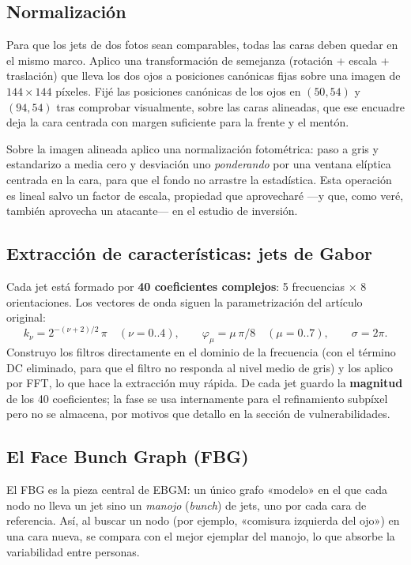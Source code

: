 \documentclass[11pt,a4paper]{article}
\begin{document}
\subsection{Normalización}

Para que los jets de dos fotos sean comparables, todas las caras deben quedar en el mismo
marco. Aplico una transformación de semejanza (rotación + escala + traslación) que lleva los
dos ojos a posiciones canónicas fijas sobre una imagen de $144\times144$ píxeles. Fijé las
posiciones canónicas de los ojos en $(50,54)$ y $(94,54)$ tras comprobar visualmente, sobre
las caras alineadas, que ese encuadre deja la cara centrada con margen suficiente para la
frente y el mentón.

Sobre la imagen alineada aplico una normalización fotométrica: paso a gris y estandarizo a
media cero y desviación uno \emph{ponderando} por una ventana elíptica centrada en la cara,
para que el fondo no arrastre la estadística. Esta operación es lineal salvo un factor de
escala, propiedad que aprovecharé ---y que, como veré, también aprovecha un atacante--- en el
estudio de inversión.

\subsection{Extracción de características: jets de Gabor}

Cada jet está formado por \textbf{40 coeficientes complejos}: 5 frecuencias
$\times$ 8 orientaciones. Los vectores de onda siguen la parametrización del artículo original:
\[
k_\nu = 2^{-(\nu+2)/2}\,\pi \quad (\nu=0..4), \qquad
\varphi_\mu = \mu\,\pi/8 \quad (\mu=0..7), \qquad \sigma = 2\pi .
\]
Construyo los filtros directamente en el dominio de la frecuencia (con el término DC
eliminado, para que el filtro no responda al nivel medio de gris) y los aplico por FFT, lo que
hace la extracción muy rápida. De cada jet guardo la \textbf{magnitud} de los 40 coeficientes;
la fase se usa internamente para el refinamiento subpíxel pero no se almacena, por motivos que
detallo en la sección de vulnerabilidades.

\subsection{El Face Bunch Graph (FBG)}

El FBG es la pieza central de EBGM: un único grafo «modelo» en el que cada nodo no lleva un
jet sino un \emph{manojo} (\emph{bunch}) de jets, uno por cada cara de referencia. Así, al
buscar un nodo (por ejemplo, «comisura izquierda del ojo») en una cara nueva, se compara con
el mejor ejemplar del manojo, lo que absorbe la variabilidad entre personas.
\end{document}
